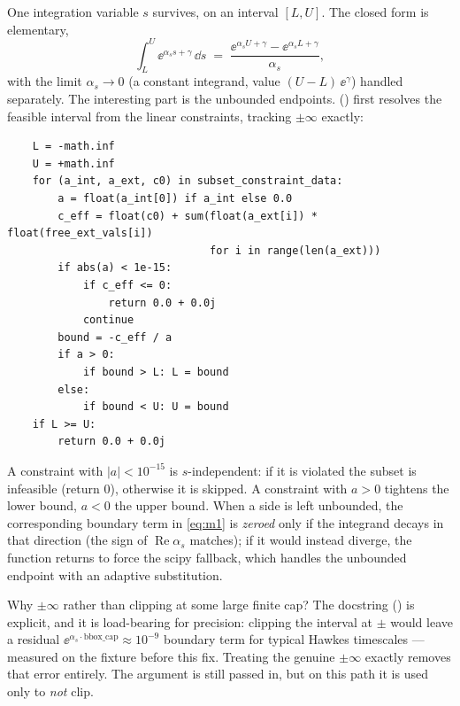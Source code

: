 One integration variable $s$ survives, on an interval $[L,U]$. The closed form is
elementary,
\begin{equation}
  \int_L^U \ee^{\alpha_s s + \gamma}\,\dd s
  \;=\;
  \frac{\ee^{\alpha_s U + \gamma} - \ee^{\alpha_s L + \gamma}}{\alpha_s},
  \label{eq:m1}
\end{equation}
with the limit $\alpha_s \to 0$ (a constant integrand, value $(U-L)\,\ee^\gamma$)
handled separately. The interesting part is the unbounded endpoints.
 () first
resolves the feasible interval from the linear constraints, tracking $\pm\infty$
exactly:
\begin{lstlisting}
    L = -math.inf
    U = +math.inf
    for (a_int, a_ext, c0) in subset_constraint_data:
        a = float(a_int[0]) if a_int else 0.0
        c_eff = float(c0) + sum(float(a_ext[i]) * float(free_ext_vals[i])
                                for i in range(len(a_ext)))
        if abs(a) < 1e-15:
            if c_eff <= 0:
                return 0.0 + 0.0j
            continue
        bound = -c_eff / a
        if a > 0:
            if bound > L: L = bound
        else:
            if bound < U: U = bound
    if L >= U:
        return 0.0 + 0.0j
\end{lstlisting}
A constraint with $|a| < 10^{-15}$ is $s$-independent: if it is violated the
subset is infeasible (return $0$), otherwise it is skipped. A constraint with
$a>0$ tightens the lower bound, $a<0$ the upper bound. When a side is left
unbounded, the corresponding boundary term in \eqref{eq:m1} is \emph{zeroed} only
if the integrand decays in that direction (the sign of
$\operatorname{Re}\alpha_s$ matches); if it would instead diverge, the function
returns  to force the scipy fallback, which handles the unbounded
endpoint with an adaptive substitution.

\begin{gotcha}
Why $\pm\infty$ rather than clipping at some large finite cap? The docstring
() is explicit, and it is load-bearing for
precision: clipping the interval at $\pm$ would leave a residual
$\ee^{\alpha_s\cdot\text{bbox\_cap}} \approx 10^{-9}$ boundary term for typical
Hawkes timescales --- measured on the  fixture before
this fix. Treating the genuine $\pm\infty$ exactly removes that error entirely.
The  argument is still passed in, but on this path it is used only
to \emph{not} clip.
\end{gotcha}

